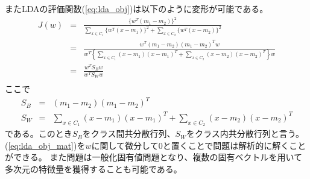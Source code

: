 またLDAの評価関数(\ref{eq:lda_obj})は以下のように変形が可能である。
\begin{eqnarray}
    \label{eq:lda_obj_mat}
    J(w) 
    & = & \frac{\{w^T(m_1-m_2)\}^2}{\sum_{x\in C_1}\{w^T(x-m_1)\}^2 + \sum_{x\in C_2}\{w^T(x-m_2)\}^2} \nonumber \\
    & = & \frac{w^T(m_1-m_2)(m_1-m_2)^Tw} {w^T\left\{ \sum_{x\in C_1} (x-m_1)(x-m_1)^T + \sum_{x\in C_2} (x-m_2)(x-m_2)^T \right\}w} \nonumber \\
    & = & \frac{w^TS_Bw} {w^TS_Ww} \\
    \nonumber 
\end{eqnarray}
ここで
\begin{eqnarray}
    S_B &=& (m_1-m_2)(m_1-m_2)^T \\
    S_W &=& \sum_{x\in C_1} (x-m_1)(x-m_1)^T + \sum_{x\in C_2} (x-m_2)(x-m_2)^T
\end{eqnarray}
である。このとき\(S_B\)をクラス間共分散行列、\(S_W\)をクラス内共分散行列と言う。
(\ref{eq:lda_obj_mat})を\(w\)に関して微分して\(0\)と置くことで問題は解析的に解くことができる。
また問題は一般化固有値問題となり、複数の固有ベクトルを用いて多次元の特徴量を獲得することも可能である。

